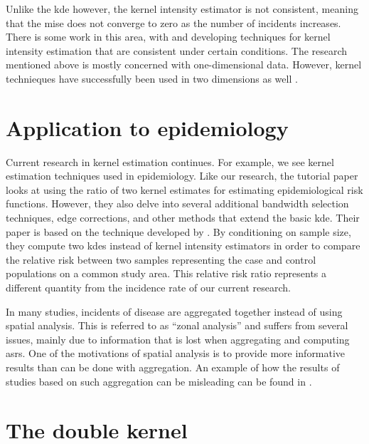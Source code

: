 Unlike the \gls{kde} however,
the \gls{kernel intensity estimator} is not consistent,
meaning that the \gls{mise} does not converge to zero as the number of incidents increases.
There is some work in this area,
with \citet{guan2008consistent} and \citet{fuentes2016consistent} developing techniques for \gls{kernel intensity estimation} that are consistent under certain conditions.
The research mentioned above is mostly concerned with one-dimensional data.
However, kernel technieques have successfully been used in two dimensions as well \citep{scott1992multivariate}.

\section{Application to epidemiology}

Current research in kernel estimation continues.
For example, we see kernel estimation techniques used in epidemiology.
Like our research,
the tutorial paper \citet{davies2018tutorial} looks at using the ratio of two kernel estimates for estimating epidemiological risk functions.
However,
they also delve into several additional bandwidth selection techniques,
edge corrections,
and other methods that extend the basic \gls{kde}.
Their paper is based on the technique developed by \citet{bithell1990application,bithell1991estimation,kelsall1995kernel}.
By conditioning on sample size,
they compute two \glspl{kde} instead of \glspl{kernel intensity estimator} in order to compare the relative risk between two samples representing the case and control populations on a common study area.
This relative risk ratio represents a different quantity from the incidence rate of our current research.

In many studies,
incidents of disease are aggregated together instead of using spatial analysis.
This is referred to as ``zonal analysis'' and suffers from several issues,
mainly due to information that is lost when aggregating and computing \glspl{asr}.
One of the motivations of spatial analysis is to provide more informative results than can be done with aggregation.
An example of how the results of studies based on such aggregation can be misleading can be found in \citet{portnov2007ecological}.

\section{The double kernel}

